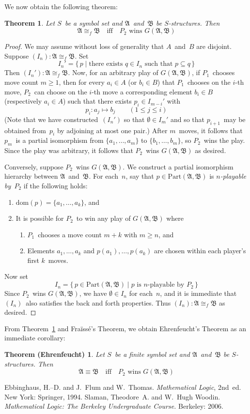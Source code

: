\documentclass[letterpaper]{article}
\newcommand{\A}{\mathfrak{A}}
\newcommand{\B}{\mathfrak{B}}
\newcommand{\dom}{\mathrm{dom}}
\newcommand{\pisos}{\mathrm{Part}}
\newcommand{\iso}{\cong}
\newcommand{\fiso}{\iso_f}
\newcommand{\ef}{Ehrenfeucht}
\newcommand{\fr}{Fra\"iss\'e}
\numberwithin{equation}{section}
\theoremstyle{plain}
\newtheorem{thm}[equation]{Theorem}
\newtheorem{eft}[equation]{Theorem (\ef)}
\theoremstyle{definition}
\begin{document}
We now obtain the following theorem:
\begin{thm}
Let $S$~be a symbol set and $\A$~and~$\B$ be $S$-structures. Then
$$\A\fiso\B\quad\text{iff}\quad P_2\text{ wins }G(\A,\B)$$
\label{thm:eflemma}
\end{thm}
\begin{proof}
We may assume without loss of generality that $A$~and~$B$ are disjoint. Suppose $(I_n):\A\fiso\B$. Set
$$I_n'=\{\,p\mid\text{there exists $q\in I_n$ such that $p\subseteq q$}\,\}$$
Then $(I_n'):\A\fiso\B$. Now, for an arbitrary play of $G(\A,\B)$, if $P_1$~chooses move count $m\ge 1$, then for every $a_i\in A$ (or $b_i\in B$) that $P_1$~chooses on the $i$-th move, $P_2$~can choose on the $i$-th move a corresponding element $b_i\in B$ (respectively $a_i\in A$) such that there exists $p_i\in I_{m-i}'$ with
$$p_i:a_j\mapsto b_j\qquad(1\le j\le i)$$
(Note that we have constructed~$(I_n')$ so that $\emptyset\in I_m'$ and so that $p_{i+1}$~may be obtained from~$p_i$ by adjoining at most one pair.) After $m$~moves, it follows that $p_m$~is a partial isomorphism from $\{a_1,\ldots,a_m\}$ to $\{b_1,\ldots,b_m\}$, so $P_2$~wins the play. Since the play was arbitrary, it follows that $P_2$~wins $G(\A,\B)$ as desired.

Conversely, suppose $P_2$~wins $G(\A,\B)$. We construct a partial isomorphism hierarchy between $\A$~and~$\B$. For each~$n$, say that $p\in\pisos(\A,\B)$ is \emph{$n$-playable by~$P_2$} if the following holds:
\begin{enumerate}[itemsep=0pt]
\item $\dom(p)=\{a_1,\ldots,a_k\}$, and
\item It is possible for $P_2$~to win any play of $G(\A,\B)$ where
\begin{enumerate}[itemsep=0pt]
\item $P_1$~chooses a move count $m+k$ with $m\ge n$, and
\item Elements $a_1,\ldots,a_k$ and $p(a_1),\ldots,p(a_k)$ are chosen within each player's first $k$~moves.
\end{enumerate}
\end{enumerate}
Now set
$$I_n=\{\,p\in\pisos(\A,\B)\mid\text{$p$~is $n$-playable by~$P_2$}\,\}$$
Since $P_2$~wins $G(\A,\B)$, we have $\emptyset\in I_n$ for each~$n$, and it is immediate that $(I_n)$~also satisfies the back and forth properties. Thus $(I_n):\A\fiso\B$ as desired.
\end{proof}
\noindent From Theorem~\ref{thm:eflemma} and \fr's Theorem, we obtain \ef's Theorem as an immediate corollary:
\begin{eft}
Let $S$~be a finite symbol set and $\A$~and~$\B$ be $S$-structures. Then
$$\A\equiv\B\quad\text{iff}\quad P_2\text{ wins }G(\A,\B)$$
\end{eft}
\begin{thebibliography}{0}
 Ebbinghaus, H.--D. and J.~Flum and W.~Thomas. \emph{Mathematical Logic}, 2nd~ed. New York: Springer, 1994.
Slaman, Theodore~A. and W.~Hugh Woodin. \emph{Mathematical Logic: The Berkeley Undergraduate Course.} Berkeley: 2006.
\end{thebibliography}
\end{document}
